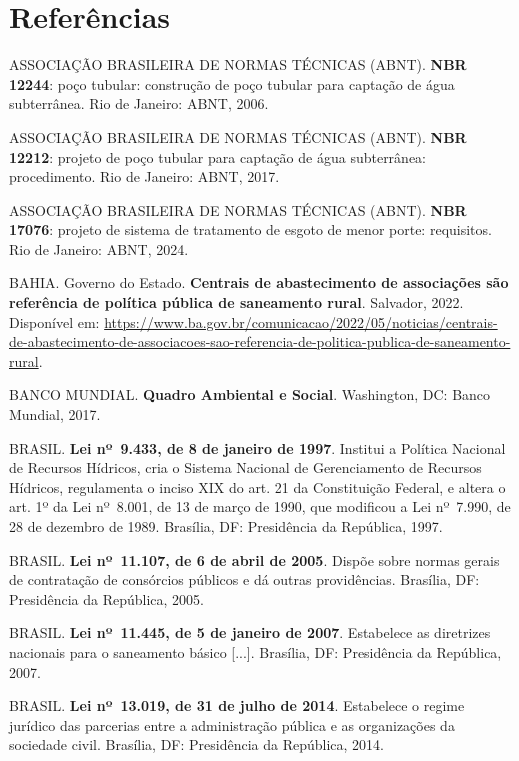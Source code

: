\chapter*{Referências}
\begin{SingleSpacing}\raggedright
\noindent ASSOCIAÇÃO BRASILEIRA DE NORMAS TÉCNICAS (ABNT). \textbf{NBR 12244}: poço tubular: construção de poço tubular para captação de água subterrânea. Rio de Janeiro: ABNT, 2006.\par\medskip
\noindent ASSOCIAÇÃO BRASILEIRA DE NORMAS TÉCNICAS (ABNT). \textbf{NBR 12212}: projeto de poço tubular para captação de água subterrânea: procedimento. Rio de Janeiro: ABNT, 2017.\par\medskip
\noindent ASSOCIAÇÃO BRASILEIRA DE NORMAS TÉCNICAS (ABNT). \textbf{NBR 17076}: projeto de sistema de tratamento de esgoto de menor porte: requisitos. Rio de Janeiro: ABNT, 2024.\par\medskip
\noindent BAHIA. Governo do Estado. \textbf{Centrais de abastecimento de associações são referência de política pública de saneamento rural}. Salvador, 2022. Disponível em: \url{https://www.ba.gov.br/comunicacao/2022/05/noticias/centrais-de-abastecimento-de-associacoes-sao-referencia-de-politica-publica-de-saneamento-rural}.\par\medskip
\noindent BANCO MUNDIAL. \textbf{Quadro Ambiental e Social}. Washington, DC: Banco Mundial, 2017.\par\medskip
\noindent BRASIL. \textbf{Lei nº~9.433, de 8 de janeiro de 1997}. Institui a Política Nacional de Recursos Hídricos, cria o Sistema Nacional de Gerenciamento de Recursos Hídricos, regulamenta o inciso XIX do art. 21 da Constituição Federal, e altera o art. 1º da Lei nº~8.001, de 13 de março de 1990, que modificou a Lei nº~7.990, de 28 de dezembro de 1989. Brasília, DF: Presidência da República, 1997.\par\medskip
\noindent BRASIL. \textbf{Lei nº~11.107, de 6 de abril de 2005}. Dispõe sobre normas gerais de contratação de consórcios públicos e dá outras providências. Brasília, DF: Presidência da República, 2005.\par\medskip
\noindent BRASIL. \textbf{Lei nº~11.445, de 5 de janeiro de 2007}. Estabelece as diretrizes nacionais para o saneamento básico [...]. Brasília, DF: Presidência da República, 2007.\par\medskip
\noindent BRASIL. \textbf{Lei nº~13.019, de 31 de julho de 2014}. Estabelece o regime jurídico das parcerias entre a administração pública e as organizações da sociedade civil. Brasília, DF: Presidência da República, 2014.\par\medskip

\end{SingleSpacing}
